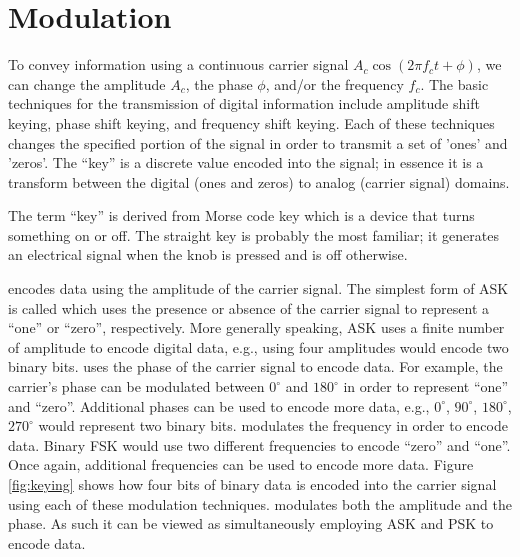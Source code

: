 \section{Modulation}
\label{subsec:modulation}

To convey information using a continuous carrier signal $A_c \cos (2 \pi f_c t + \phi)$, we can change the amplitude $A_c$, the phase $\phi$, and/or the frequency $f_c$. The basic techniques for the transmission of digital information include amplitude shift keying, phase shift keying, and frequency shift keying. Each of these techniques changes the specified portion of the signal in order to transmit a set of 'ones' and 'zeros'. The ``key'' is a discrete value encoded into the signal; in essence it is a transform between the digital (ones and zeros) to analog (carrier signal) domains. 

\begin{aside}
The term ``key'' is derived from Morse code key which is a device that turns something on or off. The straight key is probably the most familiar; it generates an electrical signal when the knob is pressed and is off otherwise.
\end{aside}

 encodes data using the amplitude of the carrier signal. The simplest form of ASK is called  which uses the presence or absence of the carrier signal to represent a ``one'' or ``zero'', respectively. More generally speaking, ASK uses a finite number of amplitude to encode digital data, e.g., using four amplitudes would encode two binary bits.   uses the phase of the carrier signal to encode data. For example, the carrier's phase can be modulated between $0^{\circ}$ and $180^{\circ}$ in order to represent ``one'' and ``zero''. Additional phases can be used to encode more data, e.g., $0^{\circ}$, $90^{\circ}$, $180^{\circ}$, $270^{\circ}$ would represent two binary bits.  modulates the frequency in order to encode data. Binary FSK would use two different frequencies to encode ``zero'' and ``one''. Once again, additional frequencies can be used to encode more data.  Figure \ref{fig:keying} shows how four bits of binary data is encoded into the carrier signal using each of these modulation techniques.   modulates both the amplitude and the phase. As such it can be viewed as simultaneously employing ASK and PSK to encode data.  

